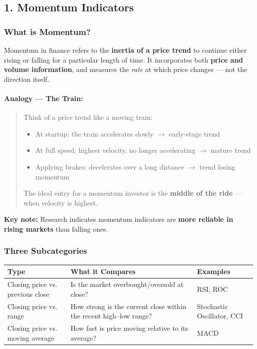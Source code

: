 \documentclass[12pt,openany]{book}
\begin{document}
\subsection{1. Momentum Indicators}

\subsubsection{What is Momentum?}

Momentum in finance refers to the \textbf{inertia of a price trend} to continue either rising or falling for a particular length of time. It incorporates both \textbf{price and volume information}, and measures the \emph{rate} at which price changes --- not the direction itself.

\paragraph{Analogy --- The Train:}
\begin{quote}
Think of a price trend like a moving train:
\begin{itemize}[leftmargin=*]
    \item At startup: the train accelerates slowly \(\rightarrow\) early-stage trend
    \item At full speed: highest velocity, no longer accelerating \(\rightarrow\) mature trend
    \item Applying brakes: decelerates over a long distance \(\rightarrow\) trend losing momentum
\end{itemize}

The ideal entry for a momentum investor is the \textbf{middle of the ride} --- when velocity is highest.

\end{quote}
\textbf{Key note:} Research indicates momentum indicators are \textbf{more reliable in rising markets} than falling ones.

\subsubsection{Three Subcategories}

\begin{center}
\small
\renewcommand{\arraystretch}{1.2}
\begin{tabular}{|L{0.25\textwidth}|L{0.34\textwidth}|L{0.31\textwidth}|}
\hline
 \textbf{Type} & \textbf{What it Compares} & \textbf{Examples} \\ \hline
 Closing price vs. previous close & Is the market overbought/oversold at close? & RSI, ROC \\ \hline
 Closing price vs. range & How strong is the current close within the recent high--low range? & Stochastic Oscillator, CCI \\ \hline
 Closing price vs. moving average & How fast is price moving relative to its average? & MACD \\ \hline
\end{tabular}
\end{center}
\end{document}
